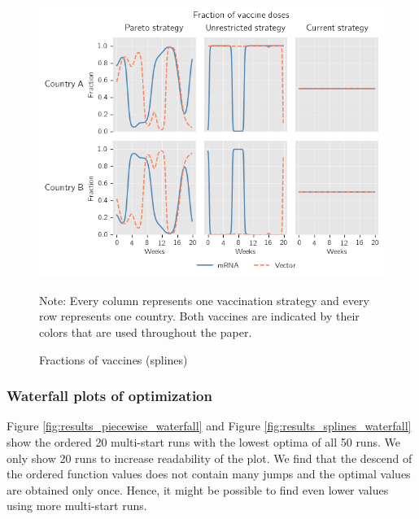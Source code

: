 \begin{figure}[h!]
\centering
\includegraphics[scale=0.75]{images/splines_vaccine_fractions.png}\\
\begin{flushleft}
\scriptsize{Note:} Every column represents one vaccination strategy and every row represents one country. Both vaccines are indicated by their colors that are used throughout the paper. 
\end{flushleft}
\caption{Fractions of vaccines (splines)}
\label{fig:results_splines_allocation_fractions}
\end{figure}

\clearpage
\subsubsection{Waterfall plots of optimization}
\label{A:waterfall}

Figure \ref{fig:results_piecewise_waterfall} and Figure \ref{fig:results_splines_waterfall} show the ordered 20 multi-start runs with the lowest optima of all 50 runs. We only show 20 runs to increase readability of the plot. We find that the descend of the ordered function values does not contain many jumps and the optimal values are obtained only once. Hence, it might be possible to find even lower values using more multi-start runs.


